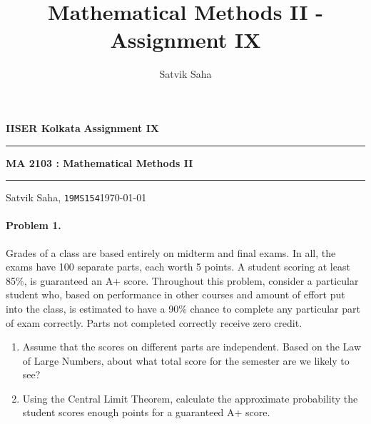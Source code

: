 \documentclass[10pt]{article}
\title{Mathematical Methods II - Assignment IX}
\author{Satvik Saha}
\date{}
\begin{document}
        \par\textbf{IISER Kolkata} \hfill \textbf{Assignment IX}
        \vspace{3pt}
        \hrule
        \vspace{3pt}
        \begin{center}
                \LARGE{\textbf{MA 2103 : Mathematical Methods II}}
        \end{center}
        \vspace{3pt}
        \hrule
        \vspace{3pt}
        Satvik Saha, \texttt{19MS154}\hfill\today
        \vspace{20pt}

        \paragraph{Problem 1.} Grades of a class are based entirely on midterm and final exams.
        In all, the exams have 100 separate parts, each worth 5 points. A student scoring at least 85\%, is guaranteed an A+ score.
        Throughout this problem, consider a particular student who, based on performance in other courses and amount of effort put into the class,
        is estimated to have a 90\% chance to complete any particular part of exam correctly. Parts not completed correctly receive zero credit.
        \begin{enumerate}
                \item Assume that the scores on different parts are independent. Based on the Law of Large Numbers, about what total score for
                the semester are we likely to see?
                \item Using the Central Limit Theorem, calculate the approximate probability the student scores enough points for a guaranteed A+ score.
        \end{enumerate}
\end{document}
